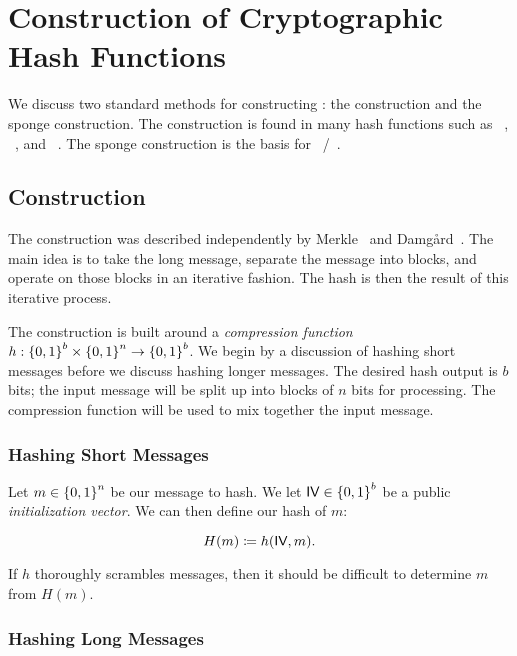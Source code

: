 \section{Construction of Cryptographic Hash Functions}

We discuss two standard methods for constructing
:
the \MD{} construction and
the sponge construction.
The \MD{} construction is found in many \glspl{hash function} such as
\MDFive{}~\cite{rfc1321}, \ShaOne{}~\cite{FIPS-180-1-1995},
and \ShaTwo{}~\cite{FIPS-180-4-2015}.
The sponge construction is the basis for
\Keccak{}~\cite{KeccakSponge2011}/\ShaThree{}~\cite{FIPS-202}.

\subsection{\MD{} Construction}
\label{app:crypto_md_construction}

The \MD{} construction was described independently 
by Merkle~\cite{merkle1979secrecy}
and Dam\-g\r{a}rd~\cite{damgaard1989design}.
The main idea is to take the long message,
separate the message into blocks,
and operate on those blocks in an iterative fashion.
The hash is then the result of this iterative process.

The construction is built around a \emph{compression function}
$h:\left\{ 0,1 \right\}^{b}\times\left\{ 0,1 \right\}^{n}\to\left\{ 0,1 \right\}^{b}$.
We begin by a discussion of hashing short messages
before we discuss hashing longer messages.
The desired hash output is $b$ bits;
the input message will be split up into blocks of $n$ bits for processing.
The compression function will be used to mix together
the input message.

\subsubsection{Hashing Short Messages}

Let $m\in\left\{ 0,1 \right\}^{n}$ be our message to hash.
We let $\textsf{IV}\in\left\{ 0,1 \right\}^{b}$ be a public
\emph{\gls{initialization vector}}.
We can then define our hash of $m$:

\begin{equation}
    H(m) \coloneqq{} h(\textsf{IV}, m).
\end{equation}

\noindent
If $h$ thoroughly scrambles messages, then it should be difficult
to determine $m$ from $H(m)$.

\subsubsection{Hashing Long Messages}

